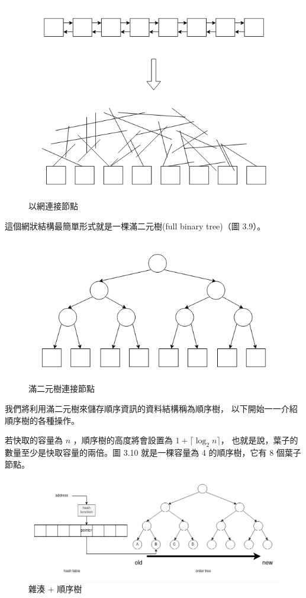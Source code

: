 \begin{figure}[h!]
\includegraphics[width=\textwidth]{節點網}
\caption{以網連接節點}
\end{figure}

這個網狀結構最簡單形式就是一棵滿二元樹(full binary tree)（圖 3.9）。

\begin{figure}[h!]
\includegraphics[width=\textwidth]{滿二元樹}
\caption{滿二元樹連接節點}
\end{figure}

我們將利用滿二元樹來儲存順序資訊的資料結構稱為順序樹，
以下開始一一介紹順序樹的各種操作。

若快取的容量為 $n$ ，順序樹的高度將會設置為 $1 + \lceil \log_2 n \rceil$，
也就是說，葉子的數量至少是快取容量的兩倍。圖 3.10 就是一棵容量為 4 的順序樹，它有 8 個葉子節點。

\begin{figure}[h!]
\includegraphics[width=\textwidth]{雜湊順序樹}
\caption{雜湊 + 順序樹}
\end{figure}

